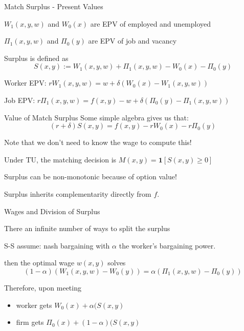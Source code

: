 \documentclass{beamer}%
\begin{document}
\begin{frame}{Match Surplus - Present Values}

\begin{midi}
\item $W_1(x,y,w)$ and $W_0(x)$ are EPV of employed and unemployed
\item $\Pi_1(x,y,w)$ and $\Pi_0(y)$ are EPV of job and vacancy
\item Surplus is defined as
\begin{equation*}
S(x,y) := W_1(x,y,w) + \Pi_1(x,y,w) - W_0(x) - \Pi_0(y)
\end{equation*}
\item Worker EPV: $rW_1(x,y,w) = w + \delta(W_0(x) -W_1(x,y,w)) $
\item Job EPV:    $r\Pi_1(x,y,w) = f(x,y) -w  + \delta(\Pi_0(y) -\Pi_1(x,y,w)) $
\end{midi}
\end{frame}

\begin{frame}{Value of Match Surplus}
Some simple algebra gives us that:
\begin{equation*}
(r+\delta) S(x,y) = f(x,y) - rW_0(x) - r\Pi_0(y)
\end{equation*}
\begin{midi}
\item Note that we don't need to know the wage to compute this!
\item Under TU, the matching decision is $M(x,y) = \mathbf{1}[S(x,y)\geq0]$
\item Surplus can be non-monotonic because of option value!
\item Surplus inherits complementarity directly from $f$.
\end{midi}
\end{frame}

\begin{frame}{Wages and Division of Surplus}
\begin{midi}
\item There an infinite number of ways to split the surplus
\item S-S assume: nash bargaining with $\alpha$ the worker's bargaining power.
\item then the optimal wage $w(x,y)$ solves
\begin{equation*}
(1-\alpha)\left(W_1(x,y,w) - W_0(y) \right) = \alpha\left(\Pi_1(x,y,w) - \Pi_0(y)\right)
\end{equation*}
\pause
\item Therefore, upon meeting
\begin{itemize}
\item worker gets $W_0(x) + \alpha(S(x,y)$
\item firm gets $\Pi_0(x) + (1-\alpha)(S(x,y)$
\end{itemize}
\end{midi}
\end{frame}
\end{document}

